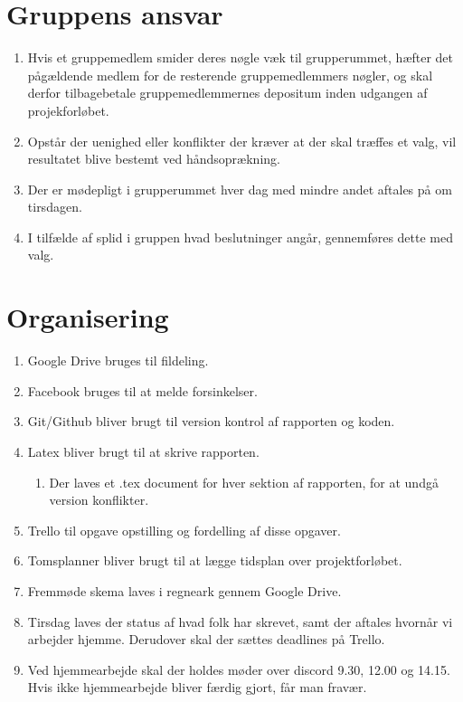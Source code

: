 \section{Gruppens ansvar}
\begin{enumerate}
\item Hvis et gruppemedlem smider deres nøgle væk til grupperummet, hæfter det pågældende medlem for de resterende gruppemedlemmers nøgler, og skal derfor tilbagebetale gruppemedlemmernes depositum inden udgangen af projekforløbet.
\item Opstår der uenighed eller konflikter der kræver at der skal træffes et valg, vil resultatet blive bestemt ved håndsoprækning.
\item Der er mødepligt i grupperummet hver dag med mindre andet aftales på om tirsdagen.
\item I tilfælde af splid i gruppen hvad beslutninger angår, gennemføres dette med valg.
\end{enumerate}

\section{Organisering}
\begin{enumerate}
\item Google Drive bruges til fildeling.
\item Facebook bruges til at melde forsinkelser.
\item Git/Github bliver brugt til version kontrol af rapporten og koden.
\item Latex bliver brugt til at skrive rapporten.
\begin{enumerate}
\item Der laves et .tex document for hver sektion af rapporten, for at undgå version konflikter.
\end{enumerate}
\item Trello til opgave opstilling og fordelling af disse opgaver.
\item Tomsplanner bliver brugt til at lægge tidsplan over projektforløbet.
\item Fremmøde skema laves i regneark gennem Google Drive.
\item Tirsdag laves der status af hvad folk har skrevet, samt der aftales hvornår vi arbejder hjemme. Derudover skal der sættes deadlines på Trello.
\item Ved hjemmearbejde skal der holdes møder over discord 9.30, 12.00 og 14.15. Hvis ikke hjemmearbejde bliver færdig gjort, får man fravær.
\end{enumerate}

